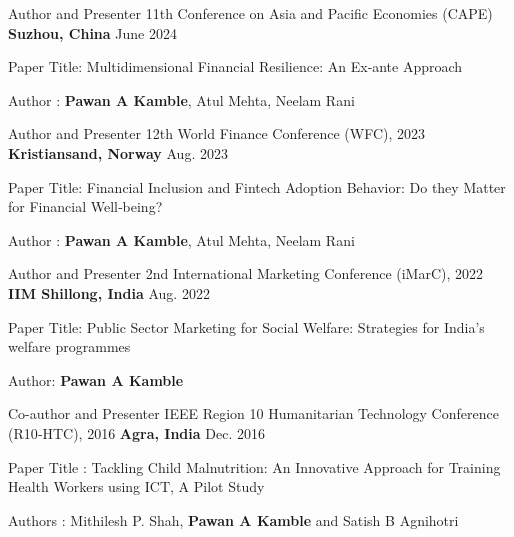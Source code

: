 \begin{cventries}
\cventry
{Author and Presenter} %
{11th Conference on Asia and Pacific Economies (CAPE)} %
{\textbf{Suzhou, China}} %
{June 2024} %
{ %
\begin{cvitems}
\item {Paper Title: Multidimensional Financial Resilience: An Ex‑ante Approach }
\item {Author : \textbf{Pawan A Kamble}, Atul Mehta, Neelam Rani}
\end{cvitems}
}


\cventry
{Author and Presenter} %
{12th World Finance Conference (WFC), 2023} %
{\textbf{Kristiansand, Norway}} %
{Aug. 2023} %
{ %
\begin{cvitems}
\item {Paper Title: Financial Inclusion and Fintech Adoption Behavior: Do they Matter for Financial Well‑being?}
\item {Author : \textbf{Pawan A Kamble}, Atul Mehta, Neelam Rani}
\end{cvitems}
}

\cventry
{Author and Presenter} %
{2nd International Marketing Conference (iMarC), 2022} %
{\textbf{IIM Shillong, India}} %
{Aug. 2022} %
{ %
\begin{cvitems}
\item {Paper Title: Public Sector Marketing for Social Welfare: Strategies for India’s welfare programmes}
\item {Author: \textbf{Pawan A Kamble}}
\end{cvitems}
}

\cventry
{Co-author and Presenter} %
{IEEE Region 10 Humanitarian Technology Conference (R10‑HTC), 2016} %
{\textbf{Agra, India}} %
{Dec. 2016} %
{ %
\begin{cvitems}
\item {Paper Title : Tackling Child Malnutrition: An Innovative Approach for Training Health Workers using ICT, A Pilot Study}
\item{Authors : Mithilesh P. Shah, \textbf{Pawan A Kamble} and Satish B Agnihotri}
\end{cvitems}
}



\end{cventries}
